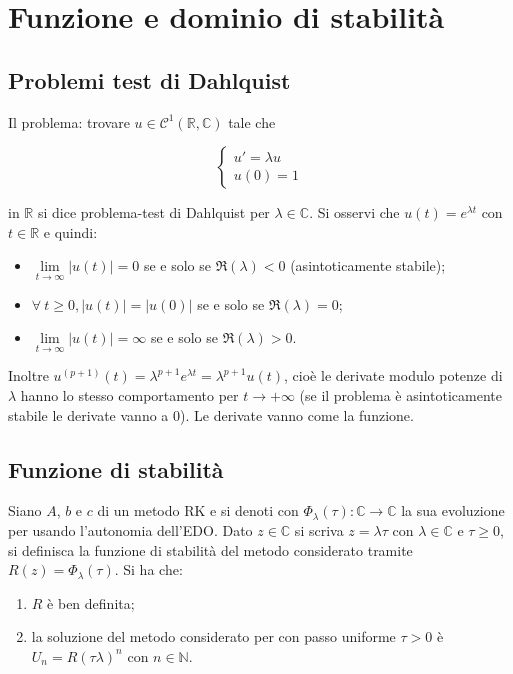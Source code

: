 \documentclass[hidelinks, 10pt]{report}
\begin{document}
\section{Funzione e dominio di stabilit\`a}
\subsection{Problemi test di Dahlquist}	\label{section:20.1}
Il problema: trovare $ u \in \mathcal{C}^{1}(\mathbb{R}, \mathbb{C}) $ tale che 

\[
\begin{cases}
u' = \lambda u \\
u(0) = 1
\end{cases}
\]

in $ \mathbb{R} $ si dice problema-test di Dahlquist per $ \lambda \in \mathbb{C} $. Si osservi che $ u(t) = e^{\lambda t} $ con $ t \in \mathbb{R} $ e quindi:
\begin{itemize}
\item $ \lim\limits_{t \to \infty} \vert u(t) \vert = 0 $ se e solo se $ \Re (\lambda) < 0 $ (asintoticamente stabile);
\item $ \forall\ t \ge 0, \vert u(t) \vert = \vert u(0) \vert $ se e solo se $ \Re (\lambda) = 0 $;
\item $ \lim\limits_{t \to \infty} \vert u(t) \vert = \infty $ se e solo se $ \Re (\lambda) > 0 $.
\end{itemize}

Inoltre $ u^{(p + 1)} (t) = \lambda^{p + 1} e^{\lambda t} = \lambda^{p + 1} u(t) $, cio\`e le derivate modulo potenze di $ \lambda $ hanno lo stesso comportamento per $ t \to +\infty $ (se il problema \`e asintoticamente stabile le derivate vanno a $ 0 $). Le derivate vanno come la funzione.

\subsection{Funzione di stabilit\`a}	\label{section:20.2}
Siano $ A $, $ b $ e $ c $ di un metodo RK e si denoti con $ \Phi_{\lambda} (\tau) : \mathbb{C} \to \mathbb{C} $ la sua evoluzione per  usando l'autonomia dell'EDO. Dato $ z \in \mathbb{C} $ si scriva $ z = \lambda \tau $ con $ \lambda \in \mathbb{C} $ e $ \tau \ge 0 $, si definisca la funzione di stabilit\`a del metodo considerato tramite $ R(z) = \Phi_{\lambda} (\tau) $. Si ha che:
\begin{enumerate}
\item $ R $ \`e ben definita;
\item la soluzione del metodo considerato per  con passo uniforme $ \tau > 0 $ \`e $ U_{n} = R(\tau \lambda)^{n} $ con $ n \in \mathbb{N} $.
\end{enumerate}
\end{document}
